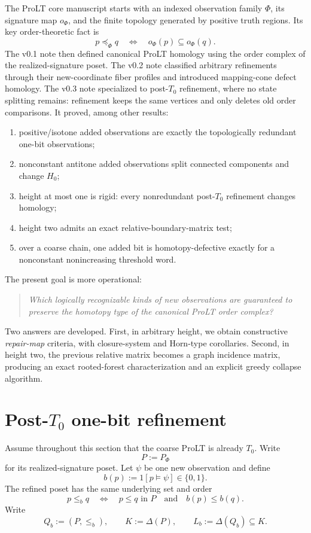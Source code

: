 \documentclass[11pt]{article}
\theoremstyle{definition}
\begin{document}
The ProLT core manuscript starts with an indexed observation family $\Phi$, its signature map $o_\Phi$, and the finite topology generated by positive truth regions. Its key order-theoretic fact is
\[
p\preceq_\Phi q
\quad\Longleftrightarrow\quad
o_\Phi(p)\subseteq o_\Phi(q).
\]
The v0.1 note then defined canonical ProLT homology using the order complex of the realized-signature poset. The v0.2 note classified arbitrary refinements through their new-coordinate fiber profiles and introduced mapping-cone defect homology. The v0.3 note specialized to post-$T_0$ refinement, where no state splitting remains: refinement keeps the same vertices and only deletes old order comparisons. It proved, among other results:
\begin{enumerate}[label=(\roman*)]
\item positive/isotone added observations are exactly the topologically redundant one-bit observations;
\item nonconstant antitone added observations split connected components and change $H_0$;
\item height at most one is rigid: every nonredundant post-$T_0$ refinement changes homology;
\item height two admits an exact relative-boundary-matrix test;
\item over a coarse chain, one added bit is homotopy-defective exactly for a nonconstant nonincreasing threshold word.
\end{enumerate}

The present goal is more operational:
\begin{quote}
\emph{Which logically recognizable kinds of new observations are guaranteed to preserve the homotopy type of the canonical ProLT order complex?}
\end{quote}

Two answers are developed. First, in arbitrary height, we obtain constructive \emph{repair-map} criteria, with closure-system and Horn-type corollaries. Second, in height two, the previous relative matrix becomes a graph incidence matrix, producing an exact rooted-forest characterization and an explicit greedy collapse algorithm.

\section{Post-$T_0$ one-bit refinement}

Assume throughout this section that the coarse ProLT is already $T_0$. Write
\[
P:=P_\Phi
\]
for its realized-signature poset. Let $\psi$ be one new observation and define
\[
b(p):=1[p\models\psi]\in\{0,1\}.
\]
The refined poset has the same underlying set and order
\begin{equation}\label{eq:fineorder}
p\le_b q
\quad\Longleftrightarrow\quad
p\le q\text{ in }P
\quad\text{and}\quad
b(p)\le b(q).
\end{equation}
Write
\[
Q_b:=(P,\le_b),\qquad
K:=\Delta(P),\qquad
L_b:=\Delta(Q_b)\subseteq K.
\]
\end{document}
